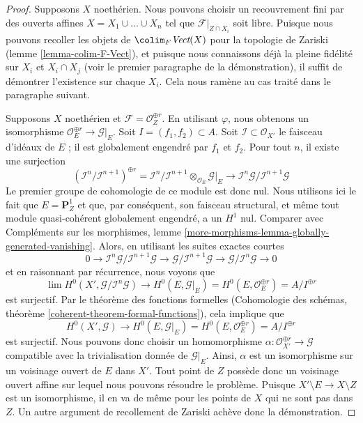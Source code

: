 \begin{proof}
\medskip\noindent
Supposons $X$ noethérien. Nous pouvons choisir un recouvrement fini par des ouverts affines
$X = X_1 \cup \ldots \cup X_n$ tel que $\mathcal{F}|_{Z \cap X_i}$ soit libre.
Puisque nous pouvons recoller les objets de $\colim_F \textit{Vect}(X)$
pour la topologie de Zariski (lemme \ref{lemma-colim-F-Vect}), et
puisque nous connaissons déjà la
pleine fidélité sur $X_i$ et $X_i \cap X_j$ (voir le premier paragraphe
de la démonstration), il suffit de démontrer l'existence sur chaque $X_i$.
Cela nous ramène au cas traité dans le paragraphe suivant.

\medskip\noindent
Supposons $X$ noethérien et $\mathcal{F} = \mathcal{O}_Z^{\oplus r}$.
En utilisant $\varphi$, nous obtenons un isomorphisme
$\mathcal{O}_E^{\oplus r} \to \mathcal{G}|_E$.
Soit $I = (f_1, f_2) \subset A$.
Soit $\mathcal{I} \subset \mathcal{O}_{X'}$
le faisceau d'idéaux de $E$ ; il est globalement engendré par $f_1$ et $f_2$.
Pour tout $n$, il existe une surjection
$$
(\mathcal{I}^n/\mathcal{I}^{n + 1})^{\oplus r} =
\mathcal{I}^n/\mathcal{I}^{n + 1} \otimes_{\mathcal{O}_E}
\mathcal{G}|_E \longrightarrow
\mathcal{I}^n\mathcal{G}/\mathcal{I}^{n + 1}\mathcal{G}
$$
Le premier groupe de cohomologie de ce module est donc nul.
Nous utilisons ici le fait que $E = \mathbf{P}^1_Z$ et que, par conséquent, son faisceau
structural, et même tout module quasi-cohérent globalement engendré,
a un $H^1$ nul. Comparer avec Compléments sur les morphismes, lemme
\ref{more-morphisms-lemma-globally-generated-vanishing}.
Alors, en utilisant les suites exactes courtes
$$
0 \to  \mathcal{I}^n\mathcal{G}/\mathcal{I}^{n + 1}\mathcal{G} \to
\mathcal{G}/\mathcal{I}^{n + 1}\mathcal{G} \to
\mathcal{G}/\mathcal{I}^n\mathcal{G} \to 0
$$
et en raisonnant par récurrence, nous voyons que
$$
\lim H^0(X', \mathcal{G}/\mathcal{I}^n\mathcal{G})
\to
H^0(E, \mathcal{G}|_E) = H^0(E, \mathcal{O}_E^{\oplus r}) =
A/I^{\oplus r}
$$
est surjectif. Par le théorème des fonctions formelles
(Cohomologie des schémas, théorème \ref{coherent-theorem-formal-functions}),
cela implique que
$$
H^0(X', \mathcal{G}) \to
H^0(E, \mathcal{G}|_E) = H^0(E, \mathcal{O}_E^{\oplus r}) =
A/I^{\oplus r}
$$
est surjectif. Nous pouvons donc choisir un homomorphisme
$\alpha : \mathcal{O}_{X'}^{\oplus r} \to \mathcal{G}$
compatible avec la trivialisation donnée
de $\mathcal{G}|_E$. Ainsi, $\alpha$ est un isomorphisme sur
un voisinage ouvert de $E$ dans $X'$. Tout point
de $Z$ possède donc un voisinage ouvert affine sur lequel
nous pouvons résoudre le problème. Puisque $X' \setminus E \to X \setminus Z$
est un isomorphisme, il en va de même pour les points de $X$ qui ne sont pas dans $Z$.
Un autre argument de recollement de Zariski achève donc la démonstration.
\end{proof}

